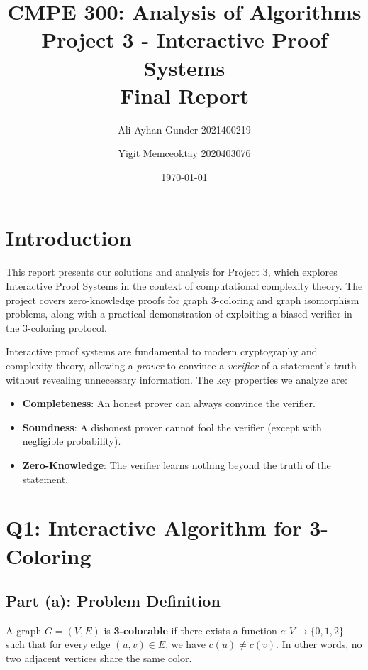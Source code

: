 \documentclass[11pt]{article}
\title{CMPE 300: Analysis of Algorithms\\Project 3 - Interactive Proof Systems\\Final Report}
\author{Ali Ayhan Gunder 2021400219 \and Yigit Memceoktay 2020403076}
\date{\today}
\begin{document}
\maketitle

\tableofcontents
\newpage

\section{Introduction}

This report presents our solutions and analysis for Project 3, which explores Interactive Proof Systems in the context of computational complexity theory. The project covers zero-knowledge proofs for graph 3-coloring and graph isomorphism problems, along with a practical demonstration of exploiting a biased verifier in the 3-coloring protocol.

Interactive proof systems are fundamental to modern cryptography and complexity theory, allowing a \textit{prover} to convince a \textit{verifier} of a statement's truth without revealing unnecessary information. The key properties we analyze are:
\begin{itemize}
    \item \textbf{Completeness}: An honest prover can always convince the verifier.
    \item \textbf{Soundness}: A dishonest prover cannot fool the verifier (except with negligible probability).
    \item \textbf{Zero-Knowledge}: The verifier learns nothing beyond the truth of the statement.
\end{itemize}

\section{Q1: Interactive Algorithm for 3-Coloring}

\subsection{Part (a): Problem Definition}

A graph $G = (V, E)$ is \textbf{3-colorable} if there exists a function $c: V \to \{0, 1, 2\}$ such that for every edge $(u, v) \in E$, we have $c(u) \neq c(v)$. In other words, no two adjacent vertices share the same color.
\end{document}

